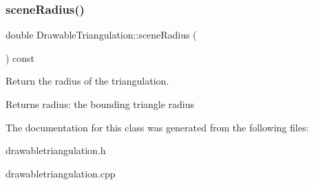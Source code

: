\subsubsection{\texorpdfstring{scene\+Radius()}{sceneRadius()}}
{\footnotesize\ttfamily double Drawable\+Triangulation\+::scene\+Radius (\begin{DoxyParamCaption}{ }\end{DoxyParamCaption}) const}



Return the radius of the triangulation. 

\begin{DoxyReturn}{Returns}
radius\+: the bounding triangle radius 
\end{DoxyReturn}


The documentation for this class was generated from the following files\+:\begin{DoxyCompactItemize}
\item 
drawabletriangulation.\+h\item 
drawabletriangulation.\+cpp\end{DoxyCompactItemize}
